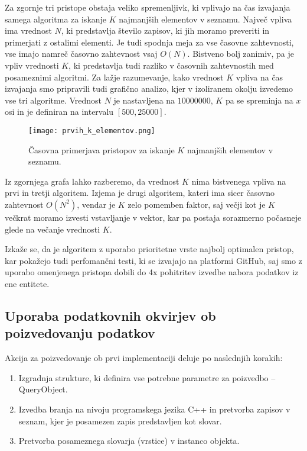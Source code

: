 \documentclass[a4paper,12pt,openright]{book}
\begin{document}
        \noindent
        Za zgornje tri pristope obstaja veliko spremenljivk, ki vplivajo na čas izvajanja samega algoritma za iskanje $K$ najmanjših elementov v seznamu. Največ vpliva ima vrednost $N$, ki predstavlja število zapisov, ki jih moramo preveriti in primerjati z ostalimi elementi. Je tudi spodnja meja za vse časovne zahtevnosti, vse imajo namreč časovno zahtevnost vsaj $O(N)$. Bistveno bolj zanimiv, pa je vpliv vrednosti $K$, ki predstavlja tudi razliko v časovnih zahtevnostih med posameznimi algoritmi. Za lažje razumevanje, kako vrednost $K$ vpliva na čas izvajanja smo pripravili tudi grafično analizo, kjer v izoliranem okolju izvedemo vse tri algoritme. Vrednost $N$ je nastavljena na $\num{10000000}$, $K$ pa se spreminja na $x$ osi in je definiran na intervalu $[500, 25000]$.

        \begin{figure}[H]
            \centerline{\texttt{[image: prvih\_k\_elementov.png]}}
            \caption{Časovna primerjava pristopov za iskanje $K$ najmanjših elementov v seznamu.}
            \label{sl:k_smallest}
        \end{figure}

        \noindent
        Iz zgornjega grafa lahko razberemo, da vrednost $K$ nima bistvenega vpliva na prvi in tretji algoritem. Izjema je drugi algoritem, kateri ima sicer časovno zahtevnost $O(N^2)$, vendar je $K$ zelo pomemben faktor, saj večji kot je $K$ večkrat moramo izvesti vstavljanje v vektor, kar pa postaja sorazmerno počasneje glede na večanje vrednosti $K$.

        Izkaže se, da je algoritem z uporabo prioritetne vrste najbolj optimalen pristop, kar pokažejo tudi perfomančni testi, ki se izvajajo na platformi GitHub, saj smo z uporabo omenjenega pristopa dobili do 4x pohitritev izvedbe nabora podatkov iz ene entitete.

        \subsection{Uporaba podatkovnih okvirjev ob poizvedovanju podatkov}

        Akcija za poizvedovanje ob prvi implementaciji deluje po naslednjih korakih:
        \begin{enumerate}
            \item Izgradnja strukture, ki definira vse potrebne parametre za poizvedbo – QueryObject.
            \item Izvedba branja na nivoju programskega jezika C++ in pretvorba zapisov v seznam, kjer je posamezen zapis predstavljen kot slovar.
            \item Pretvorba posameznega slovarja (vrstice) v instanco objekta.
        \end{enumerate}
\end{document}
